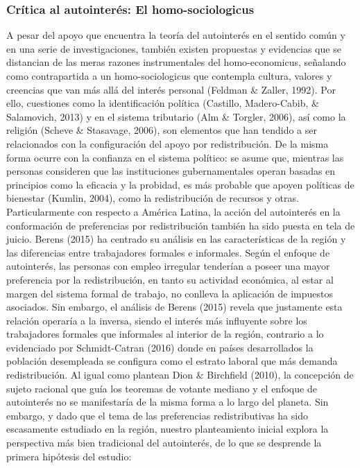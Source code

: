 \documentclass[12pt,letterpaper]{article}
\begin{document}
\subsubsection{Crítica al autointerés: El homo-sociologicus \label{sec:sec212}}

A pesar del apoyo que encuentra la teoría del autointerés en el sentido común y en una serie de investigaciones, también existen propuestas y evidencias que se distancian de las meras razones instrumentales del homo-economicus, señalando como contrapartida a un homo-sociologicus que contempla cultura, valores y creencias que van más allá del interés personal (Feldman \& Zaller, 1992). Por ello, cuestiones como la identificación política (Castillo, Madero-Cabib, \& Salamovich, 2013) y en el sistema tributario (Alm \& Torgler, 2006), así como la religión (Scheve \& Stasavage, 2006), son elementos que han tendido a ser relacionados con la configuración del apoyo por redistribución. De la misma forma ocurre con la confianza en el sistema político: se asume que, mientras las personas consideren que las instituciones gubernamentales operan basadas en principios como la eficacia y la probidad, es más probable que apoyen políticas de bienestar (Kumlin, 2004), como la redistribución de recursos y otras.\\

Particularmente con respecto a América Latina, la acción del autointerés en la conformación de preferencias por redistribución también ha sido puesta en tela de juicio. Berens (2015) ha centrado su análisis en las características de la región y las diferencias entre trabajadores formales e informales. Según el enfoque de autointerés, las personas con empleo irregular tenderían a poseer una mayor preferencia por la redistribución, en tanto su actividad económica, al estar al margen del sistema formal de trabajo, no conlleva la aplicación de impuestos asociados. Sin embargo, el análisis de Berens (2015) revela que justamente esta relación operaría a la inversa, siendo el interés más influyente sobre los trabajadores formales que informales al interior de la región, contrario a lo evidenciado por Schmidt-Catran (2016) donde en países desarrollados la población desempleada se configura como el estrato laboral que más demanda redistribución. Al igual como plantean Dion \& Birchfield (2010), la concepción de sujeto racional que guía los teoremas de votante mediano y el enfoque de autointerés no se manifestaría de la misma forma a lo largo del planeta. Sin embargo, y dado que el tema de las preferencias redistributivas ha sido escasamente estudiado en la región, nuestro planteamiento inicial explora la perspectiva más bien tradicional del autointerés, de lo que se desprende la primera hipótesis del estudio:
\end{document}
